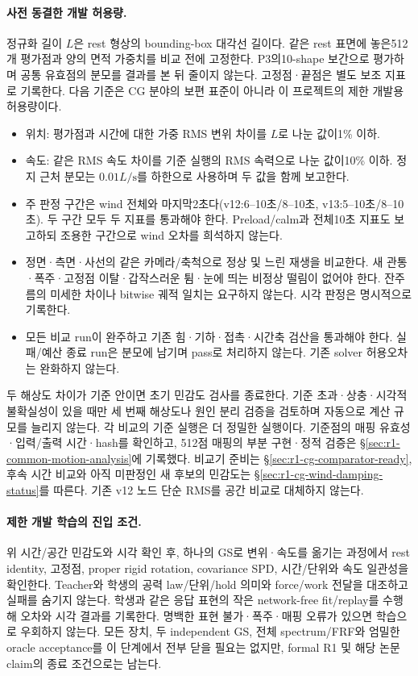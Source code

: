 \documentclass[10pt]{article}
\begin{document}
\paragraph{사전 동결한 개발 허용량.}
정규화 길이 \(L\)은 rest 형상의 bounding-box 대각선 길이다.
같은 rest 표면에 놓은512개 평가점과 양의 면적 가중치를 비교 전에 고정한다.
P3의10-shape 보간으로 평가하며 공통 유효점의 분모를 결과를 본 뒤 줄이지 않는다.
고정점·끝점은 별도 보조 지표로 기록한다. 다음 기준은 CG 분야의 보편 표준이 아니라
이 프로젝트의 제한 개발용 허용량이다.
\begin{itemize}
 \item 위치: 평가점과 시간에 대한 가중 RMS 변위 차이를 \(L\)로 나눈 값이1\% 이하.
 \item 속도: 같은 RMS 속도 차이를 기준 실행의 RMS 속력으로 나눈 값이10\% 이하.
 정지 근처 분모는 \(0.01L/\mathrm{s}\)를 하한으로 사용하며 두 값을 함께 보고한다.
 \item 주 판정 구간은 wind 전체와 마지막2초다(v12:6--10초/8--10초, v13:5--10초/8--10초).
 두 구간 모두 두 지표를 통과해야 한다.
 Preload/calm과 전체10초 지표도 보고하되 조용한 구간으로 wind 오차를 희석하지 않는다.
 \item 정면·측면·사선의 같은 카메라/축척으로 정상 및 느린 재생을 비교한다.
 새 관통·폭주·고정점 이탈·갑작스러운 튐·눈에 띄는 비정상 떨림이 없어야 한다.
 잔주름의 미세한 차이나 bitwise 궤적 일치는 요구하지 않는다. 시각 판정은 명시적으로 기록한다.
 \item 모든 비교 run이 완주하고 기존 힘·기하·접촉·시간축 검산을 통과해야 한다.
 실패/예산 종료 run은 분모에 남기며 pass로 처리하지 않는다. 기존 solver 허용오차는 완화하지 않는다.
\end{itemize}

두 해상도 차이가 기준 안이면 초기 민감도 검사를 종료한다. 기준 초과·상충·시각적 불확실성이
있을 때만 세 번째 해상도나 원인 분리 검증을 검토하며 자동으로 계산 규모를 늘리지 않는다.
각 비교의 기준 실행은 더 정밀한 실행이다. 기준점의 매핑 유효성·입력/출력 시간·hash를 확인하고,
512점 매핑의 부분 구현·정적 검증은 \S\ref{sec:r1-common-motion-analysis}에 기록했다.
비교기 준비는 \S\ref{sec:r1-cg-comparator-ready}, 후속 시간 비교와 아직 미판정인 새 후보의
민감도는 \S\ref{sec:r1-cg-wind-damping-status}를 따른다.
기존 v12 노드 단순 RMS를 공간 비교로 대체하지 않는다.

\paragraph{제한 개발 학습의 진입 조건.}
위 시간/공간 민감도와 시각 확인 후, 하나의 GS로 변위·속도를 옮기는 과정에서
rest identity, 고정점, proper rigid rotation, covariance SPD, 시간/단위와 속도 일관성을 확인한다.
Teacher와 학생의 공력 law/단위/hold 의미와 force/work 전달을 대조하고 실패를 숨기지 않는다.
학생과 같은 응답 표현의 작은 network-free fit/replay를 수행해 오차와 시각 결과를 기록한다.
명백한 표현 불가·폭주·매핑 오류가 있으면 학습으로 우회하지 않는다.
모든 장치, 두 independent GS, 전체 spectrum/FRF와 엄밀한 oracle acceptance를 이 단계에서
전부 닫을 필요는 없지만, formal R1 및 해당 논문 claim의 종료 조건으로는 남는다.
\end{document}
